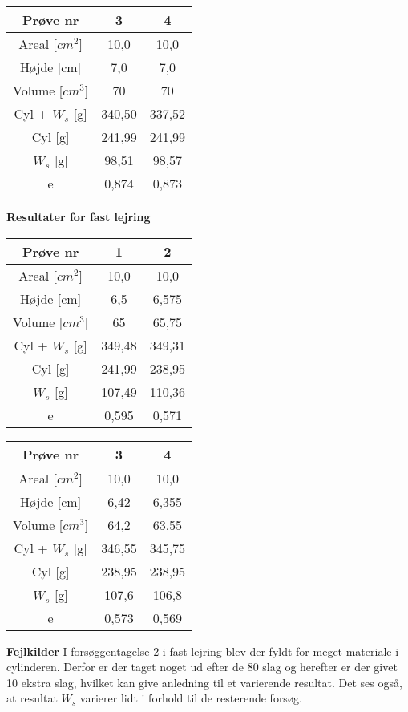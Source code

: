 \begin{center}
	\begin{tabular}{ |c|c|c| } 
		\hline
		Prøve nr & 3 & 4 \\	\hline
		Areal [$cm^2$] & 10,0 & 10,0 \\ \hline
		Højde [cm] & 7,0 & 7,0 \\ \hline
		Volume [$cm^3$] & 70 & 70 \\ \hline
		Cyl + $W_s$ [g] & 340,50 & 337,52 \\ \hline
		Cyl [g] & 241,99 & 241,99 \\ \hline
		$W_s$ [g] & 98,51 & 98,57 \\ \hline
		e & 0,874 & 0,873\\ \hline
	\end{tabular}
\end{center}

\textbf{Resultater for fast lejring}
\begin{center}
	\begin{tabular}{ |c|c|c| } 
		\hline
		Prøve nr & 1 & 2 \\	\hline 
		Areal [$cm^2$] & 10,0 & 10,0 \\ \hline
		Højde [cm] & 6,5 & 6,575 \\ \hline
		Volume [$cm^3$] & 65 & 65,75 \\ \hline
		Cyl + $W_s$ [g] & 349,48 & 349,31 \\ \hline
		Cyl [g] & 241,99 & 238,95 \\ \hline
		$W_s$ [g] & 107,49 & 110,36 \\ \hline
		e & 0,595 & 0,571 \\ \hline
	\end{tabular}
\end{center}

\begin{center}
	\begin{tabular}{ |c|c|c| } 
		\hline
		Prøve nr & 3 & 4 \\	\hline
		Areal [$cm^2$] & 10,0 & 10,0 \\ \hline
		Højde [cm] & 6,42 & 6,355 \\ \hline
		Volume [$cm^3$] & 64,2 & 63,55 \\ \hline
		Cyl + $W_s$ [g] & 346,55 & 345,75 \\ \hline
		Cyl [g] & 238,95 & 238,95 \\ \hline
		$W_s$ [g] & 107,6 & 106,8 \\ \hline
		e & 0,573 & 0,569 \\ \hline
	\end{tabular}
\end{center}

\textbf{Fejlkilder}
\newline
I forsøggentagelse 2 i fast lejring blev der fyldt for meget materiale i cylinderen. Derfor er der taget noget ud efter de 80 slag og herefter er der givet 10 ekstra slag, hvilket kan give anledning til et varierende resultat. Det ses også, at resultat $W_s$ varierer lidt i forhold til de resterende forsøg.